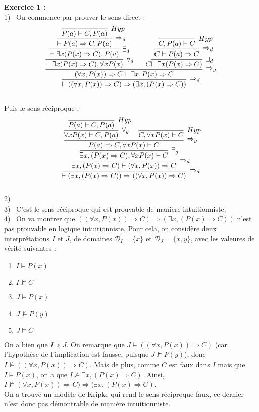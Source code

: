 \documentclass[11pt,a4paper]{article}
\begin{document}
\textbf{Exercice 1 :}\\
1) \ On commence par prouver le sens direct  : 
\[\infer[\Rightarrow_d]{\vdash ((\forall x, P(x))\Rightarrow C) \Rightarrow (\exists x, (P(x) \Rightarrow C))}
{\infer[\Rightarrow_g]{(\forall x, P(x))\Rightarrow C \vdash \exists x, P(x) \Rightarrow C}
{\infer[\forall_d]{\vdash \exists x (P(x) \Rightarrow C) , \forall x P(x)}
{\infer[\exists_d]{\vdash \exists x (P(x) \Rightarrow C) , P(a)}{\infer[\Rightarrow_d]{\vdash P(a) \Rightarrow C, P(a)}{\infer[Hyp]{P(a) \vdash C, P(a)}{}}}}\ &\ C \infer[\exists_d]{\vdash \exists x (P(x) \Rightarrow C)}{\infer[\Rightarrow_d]{C \vdash P(a) \Rightarrow C}{\infer[Hyp]{C,P(a) \vdash C}{}}}}}
\] \\
Puis le sens réciproque : 
\[\infer[\Rightarrow_d]{\vdash (\exists x, (P(x) \Rightarrow C)) \Rightarrow ((\forall x, P(x))\Rightarrow C)}{\infer[\Rightarrow_d]{\exists x, (P(x) \Rightarrow C) \vdash (\forall x, P(x))\Rightarrow C}{\infer[\exists_g]{\exists x, (P(x) \Rightarrow C), \forall x P(x) \vdash C}{\infer[\Rightarrow_g]{P(a) \Rightarrow C, \forall x P(x) \vdash C}{ \infer[\forall_g]{\forall x P(x) \vdash C, P(a)}{\infer[Hyp]{P(a) \vdash C, P(a)}{}}             &     \infer[Hyp]{C,\forall x P(x) \vdash C}{}    }}}}\]
\\

2) 
\\

3) \ C'est le sens réciproque qui est prouvable de manière intuitionniste.
\\

4) \ On va montrer que $((\forall x, P(x))\Rightarrow C) \Rightarrow (\exists x, (P(x) \Rightarrow C)) $ n'est pas prouvable en logique intuitionniste. Pour cela, on considère deux interprétations $I$ et $J$, de domaines $\mathcal{D}_I = \{x\}$ et $\mathcal{D}_J =\{x,y\}$, avec les valeures de vérité suivantes :
\begin{enumerate}
\item $I \models P(x)$
\item $I \not\models C$
\item $J \models P(x)$
\item $J \not\models P(y)$
\item $J \models C$
\end{enumerate} 
On a bien que $I \preceq J$. On remarque que $J \models ((\forall x, P(x))\Rightarrow C)$ (car l'hypothèse de l'implication est fausse, puisque $J \not\models P(y)$), donc $I \not\models ((\forall x, P(x))\Rightarrow C)$. Mais de plus, comme $C$ est faux dans $I$ mais que $I \models P(x)$, on a que $I \not\models \exists x, (P(x) \Rightarrow C) $. Ainsi, $ I \not\models (\forall x, P(x))\Rightarrow C) \Rightarrow (\exists x, (P(x) \Rightarrow C) $. \\
On a trouvé un modèle de Kripke qui rend le sens réciproque faux, ce dernier n'est donc pas démontrable de manière intuitionniste. \\
\end{document}
